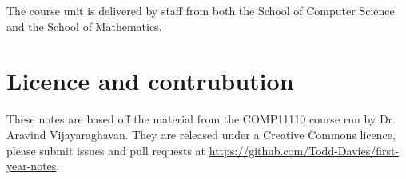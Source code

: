 The course unit is delivered by staff from both the School of Computer Science
and the School of Mathematics.

\section*{Licence and contrubution}

These notes are based off the material from the COMP11110 course run by 
Dr. Aravind Vijayaraghavan. They are released
under a Creative Commons licence, please submit issues and pull requests at
\url{https://github.com/Todd-Davies/first-year-notes}.